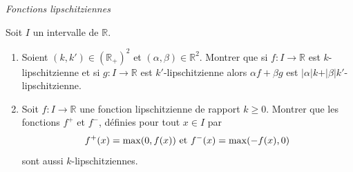 \documentclass[a4paper,10pt]{report}
\begin{document}
\bigskip

\begin{center}
\textit{{ {\large Fonctions lipschitziennes}}}
\end{center}

\medskip


\begin{Exa} Soit $I$ un intervalle de $\mathbb{R}$.

\begin{enumerate}
\item Soient $(k,k') \in (\mathbb{R}_+)^2$ et $(\alpha, \beta) \in \mathbb{R}^2$. Montrer que si $f : I \rightarrow \mathbb{R}$ est $k$-lipschitzienne et si $g : I \rightarrow \mathbb{R}$ est $k'$-lipschitzienne alors $\alpha f+ \beta g$ est $\vert \alpha \vert k  + \vert \beta \vert k'$-lipschitzienne.
\item Soit $f : I \rightarrow \mathbb{R}$ une fonction lipschitzienne de rapport $k \geq 0$. Montrer que les fonctions $f^+$ et $f^{-}$, définies pour tout $x \in I$ par 
$$ f^+(x)= \max(0,f(x)) \hbox{ et } f^{-}(x) = \max(-f(x),0) $$
sont aussi $k$-lipschitziennes.
\end{enumerate}
\end{Exa}

\corr 
\end{document}
